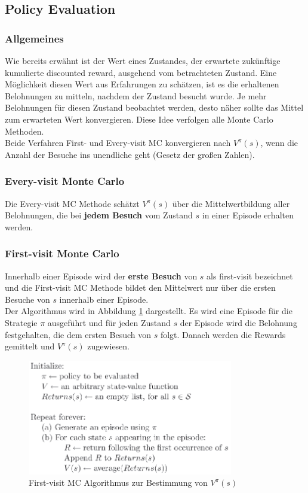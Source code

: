 \documentclass[10pt]{scrartcl}
\begin{document}
\subsection{Policy Evaluation}
\subsubsection{Allgemeines}
Wie bereits erwähnt ist der Wert eines Zustandes, der erwartete zukünftige kumulierte discounted reward, ausgehend vom betrachteten Zustand. Eine Möglichkeit diesen Wert aus Erfahrungen zu schätzen, ist es die erhaltenen Belohnungen zu mitteln, nachdem der Zustand besucht wurde. Je mehr Belohnungen für diesen Zustand beobachtet werden, desto näher sollte das Mittel zum erwarteten Wert konvergieren. Diese Idee verfolgen alle Monte Carlo Methoden.\\
Beide Verfahren First- und Every-visit MC konvergieren nach $V^{\pi}(s)$, wenn die Anzahl der Besuche ins unendliche geht (Gesetz der großen Zahlen).

\subsubsection{Every-visit Monte Carlo}
Die Every-visit MC Methode schätzt $V^{\pi}(s)$ über die Mittelwertbildung aller Belohnungen, die bei \textbf{jedem Besuch} vom Zustand $s$ in einer Episode erhalten werden.

\subsubsection{First-visit Monte Carlo}
Innerhalb einer Episode wird der \textbf{erste Besuch} von $s$ als first-visit bezeichnet und die First-visit MC Methode bildet den Mittelwert nur über die ersten Besuche von $s$ innerhalb einer Episode.\\
Der Algorithmus wird in Abbildung \ref{fig:FirstVisit} dargestellt. Es wird eine Episode für die Strategie $\pi$ ausgeführt und für jeden Zustand $s$ der Episode wird die Belohnung festgehalten, die dem ersten Besuch von $s$ folgt. Danach werden die Rewards gemittelt und $V^{\pi}(s)$ zugewiesen.

\begin{figure}[htbp]
	\centering	\includegraphics[width=0.8\textwidth]{Bilder/First-visit_MC.png}
	\caption{First-visit MC Algorithmus zur Bestimmung von $V^{\pi}(s)$}
	\label{fig:FirstVisit}
\end{figure}
\end{document}
